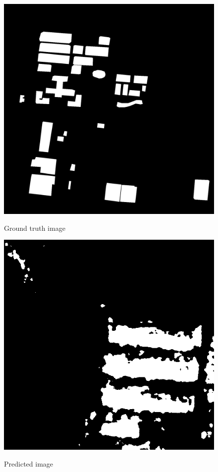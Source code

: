 \documentclass[]{IEEEtran}
\begin{document}
\begin{figure}[!hbt]
		\vspace{0.3cm}
		\begin{center}
			\includegraphics[width=0.7\columnwidth]{gt}
			\caption{Ground truth image}
			\label{fig:mp}
		    \vspace{0.2cm}
			\includegraphics[width=0.7\columnwidth]{pred}
			\caption{Predicted image}
			\label{fig:ss}
		\end{center}
	\end{figure}

\end{document}
